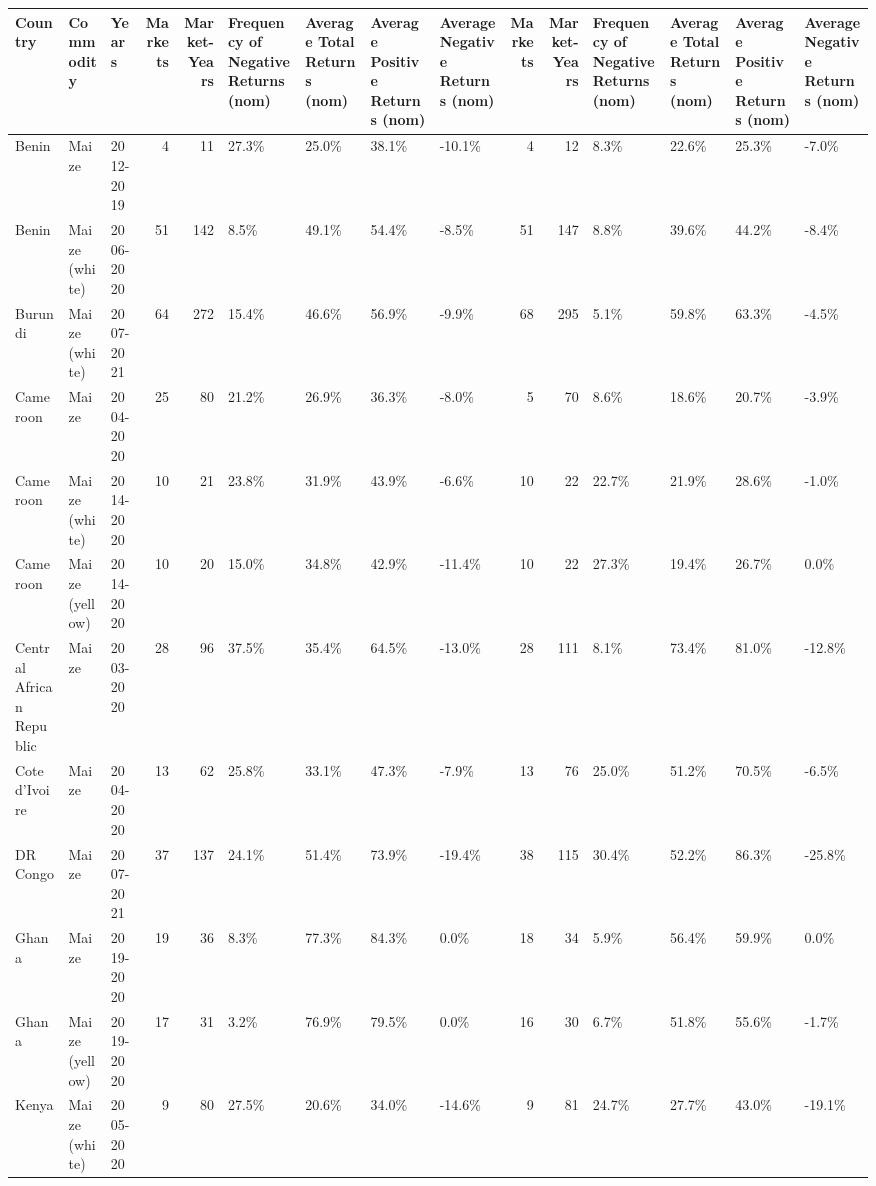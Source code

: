 \begin{table}[ht]
\centering
\begin{tabular}{lllrrllllrrllll}
  \hline
Country & Commodity & Years & Markets & Market-Years & Frequency of Negative Returns (nom) & Average Total Returns (nom) & Average Positive Returns (nom) & Average Negative Returns (nom) & Markets & Market-Years & Frequency of Negative Returns (nom) & Average Total Returns (nom) & Average Positive Returns (nom) & Average Negative Returns (nom) \\ 
  \hline
Benin & Maize & 2012-2019 &   4 &  11 & 27.3\% & 25.0\% & 38.1\% & -10.1\% &   4 &  12 & 8.3\% & 22.6\% & 25.3\% & -7.0\% \\ 
  Benin & Maize (white) & 2006-2020 &  51 & 142 & 8.5\% & 49.1\% & 54.4\% & -8.5\% &  51 & 147 & 8.8\% & 39.6\% & 44.2\% & -8.4\% \\ 
  Burundi & Maize (white) & 2007-2021 &  64 & 272 & 15.4\% & 46.6\% & 56.9\% & -9.9\% &  68 & 295 & 5.1\% & 59.8\% & 63.3\% & -4.5\% \\ 
  Cameroon & Maize & 2004-2020 &  25 &  80 & 21.2\% & 26.9\% & 36.3\% & -8.0\% &   5 &  70 & 8.6\% & 18.6\% & 20.7\% & -3.9\% \\ 
  Cameroon & Maize (white) & 2014-2020 &  10 &  21 & 23.8\% & 31.9\% & 43.9\% & -6.6\% &  10 &  22 & 22.7\% & 21.9\% & 28.6\% & -1.0\% \\ 
  Cameroon & Maize (yellow) & 2014-2020 &  10 &  20 & 15.0\% & 34.8\% & 42.9\% & -11.4\% &  10 &  22 & 27.3\% & 19.4\% & 26.7\% & 0.0\% \\ 
  Central African Republic & Maize & 2003-2020 &  28 &  96 & 37.5\% & 35.4\% & 64.5\% & -13.0\% &  28 & 111 & 8.1\% & 73.4\% & 81.0\% & -12.8\% \\ 
  Cote d'Ivoire & Maize & 2004-2020 &  13 &  62 & 25.8\% & 33.1\% & 47.3\% & -7.9\% &  13 &  76 & 25.0\% & 51.2\% & 70.5\% & -6.5\% \\ 
  DR Congo & Maize & 2007-2021 &  37 & 137 & 24.1\% & 51.4\% & 73.9\% & -19.4\% &  38 & 115 & 30.4\% & 52.2\% & 86.3\% & -25.8\% \\ 
  Ghana & Maize & 2019-2020 &  19 &  36 & 8.3\% & 77.3\% & 84.3\% & 0.0\% &  18 &  34 & 5.9\% & 56.4\% & 59.9\% & 0.0\% \\ 
  Ghana & Maize (yellow) & 2019-2020 &  17 &  31 & 3.2\% & 76.9\% & 79.5\% & 0.0\% &  16 &  30 & 6.7\% & 51.8\% & 55.6\% & -1.7\% \\ 
  Kenya & Maize (white) & 2005-2020 &   9 &  80 & 27.5\% & 20.6\% & 34.0\% & -14.6\% &   9 &  81 & 24.7\% & 27.7\% & 43.0\% & -19.1\% \\ 

\end{tabular}
\end{table}
